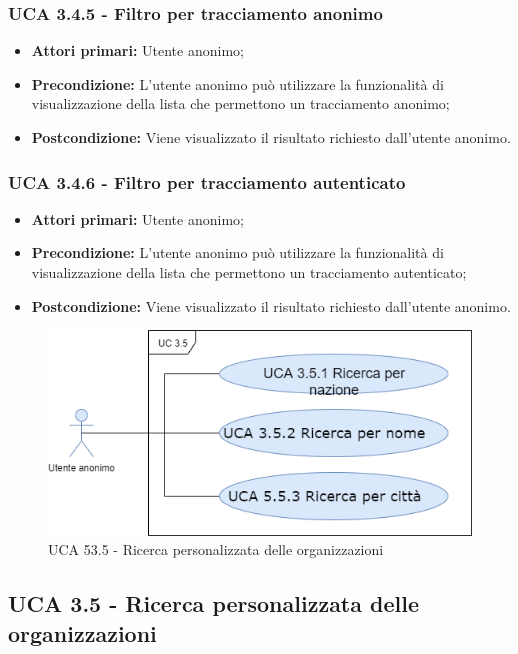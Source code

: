 \subsubsection{UCA 3.4.5 - Filtro per tracciamento anonimo}%
\begin{itemize}
	\item \textbf{Attori primari:} Utente anonimo;
	\item \textbf{Precondizione:} L’utente anonimo può utilizzare la funzionalità di visualizzazione della lista che permettono un tracciamento anonimo;
	\item \textbf{Postcondizione:} Viene visualizzato il risultato richiesto dall’utente anonimo.
\end{itemize}

\subsubsection{UCA 3.4.6 - Filtro per tracciamento autenticato}%
\begin{itemize}
	\item \textbf{Attori primari:} Utente anonimo;
	\item \textbf{Precondizione:} L’utente anonimo può utilizzare la funzionalità di visualizzazione della lista che permettono un tracciamento autenticato;
	\item \textbf{Postcondizione:} Viene visualizzato il risultato richiesto dall’utente anonimo.
\end{itemize}

\begin{figure}[h]
	\centering
	\caption{UCA 53.5 - Ricerca personalizzata delle organizzazioni}
	\includegraphics[scale=0.5]{sezioni/UseCase/Immagini/UCA3.5.png}
\end{figure}

\subsection{UCA 3.5 - Ricerca personalizzata delle organizzazioni}%

